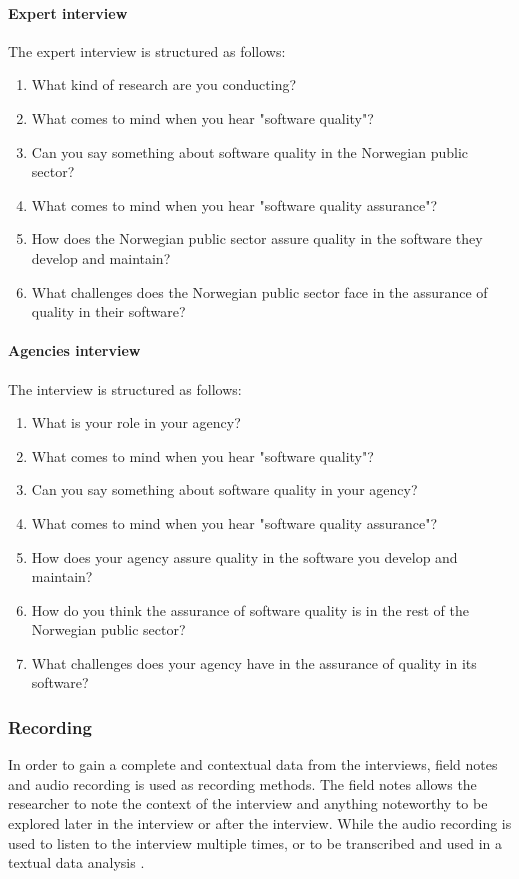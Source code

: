 \paragraph{Expert interview}
The expert interview is structured as follows:

\begin{enumerate}
    \item What kind of research are you conducting?
    \item What comes to mind when you hear "software quality"?
    \item Can you say something about software quality in the Norwegian public sector?
    \item What comes to mind when you hear "software quality assurance"?
    \item How does the Norwegian public sector assure quality in the software they develop and maintain?
    \item What challenges does the Norwegian public sector face in the assurance of quality in their software?
\end{enumerate}

\paragraph{Agencies interview}
The interview is structured as follows:

\begin{enumerate}
    \item What is your role in your agency?
    \item What comes to mind when you hear "software quality"?
    \item Can you say something about software quality in your agency?
    \item What comes to mind when you hear "software quality assurance"?
    \item How does your agency assure quality in the software you develop and maintain?
    \item How do you think the assurance of software quality is in the rest of the Norwegian public sector?
    \item What challenges does your agency have in the assurance of quality in its software?
\end{enumerate}

\subsubsection{Recording}
In order to gain a complete and contextual data from the interviews, field notes and audio recording is used as recording methods. The field notes allows the researcher to note the context of the interview and anything noteworthy to be explored later in the interview or after the interview. While the audio recording is used to listen to the interview multiple times, or to be transcribed and used in a textual data analysis \cite{bjo_2022}.


